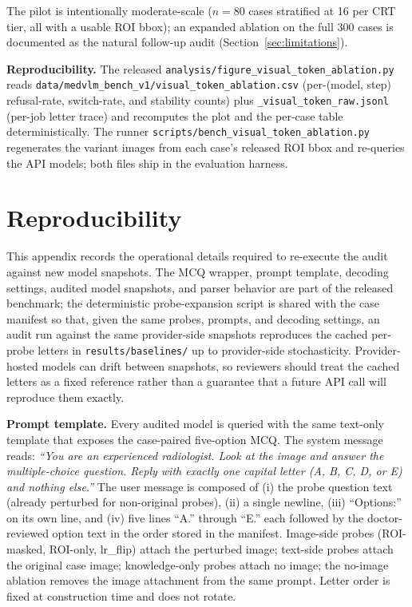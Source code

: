 \documentclass{article}
\begin{document}
The pilot is intentionally moderate-scale ($n{=}80$ cases stratified at 16 per CRT tier, all with a usable ROI bbox); an expanded ablation on the full 300 cases is documented as the natural follow-up audit (Section~\ref{sec:limitations}).

\textbf{Reproducibility.} The released \texttt{analysis/figure\_visual\_token\_ablation.py} reads \texttt{data/medvlm\_bench\_v1/visual\_token\_ablation.csv} (per-(model, step) refusal-rate, switch-rate, and stability counts) plus \texttt{\_visual\_token\_raw.jsonl} (per-job letter trace) and recomputes the plot and the per-case table deterministically. The runner \texttt{scripts/bench\_visual\_token\_ablation.py} regenerates the variant images from each case's released ROI bbox and re-queries the API models; both files ship in the evaluation harness.

\section{Reproducibility}
\label{app:reproducibility}

This appendix records the operational details required to re-execute the audit against new model snapshots. The MCQ wrapper, prompt template, decoding settings, audited model snapshots, and parser behavior are part of the released benchmark; the deterministic probe-expansion script is shared with the case manifest so that, given the same probes, prompts, and decoding settings, an audit run against the same provider-side snapshots reproduces the cached per-probe letters in \texttt{results/baselines/} up to provider-side stochasticity. Provider-hosted models can drift between snapshots, so reviewers should treat the cached letters as a fixed reference rather than a guarantee that a future API call will reproduce them exactly.

\textbf{Prompt template.} Every audited model is queried with the same text-only template that exposes the case-paired five-option MCQ. The system message reads: \emph{``You are an experienced radiologist. Look at the image and answer the multiple-choice question. Reply with exactly one capital letter (A, B, C, D, or E) and nothing else.''} The user message is composed of (i) the probe question text (already perturbed for non-original probes), (ii) a single newline, (iii) ``Options:'' on its own line, and (iv) five lines ``A.'' through ``E.'' each followed by the doctor-reviewed option text in the order stored in the manifest. Image-side probes (ROI-masked, ROI-only, lr\_flip) attach the perturbed image; text-side probes attach the original case image; knowledge-only probes attach no image; the no-image ablation removes the image attachment from the same prompt. Letter order is fixed at construction time and does not rotate.
\end{document}
